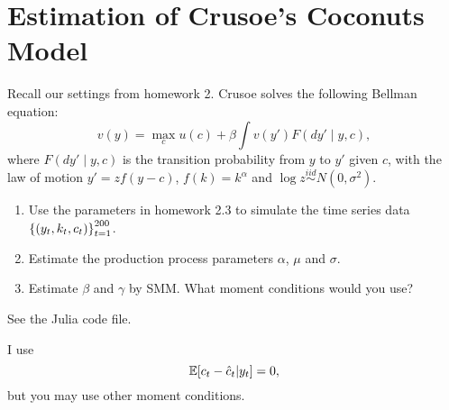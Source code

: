 \documentclass[12pt]{article}
\begin{document}
\section{Estimation of Crusoe's Coconuts Model}
Recall our settings from homework 2. Crusoe solves the following Bellman equation: 
\begin{equation*}
    v(y) = \max_{c} u(c) + \beta \int v(y') F(dy'\mid y, c),
\end{equation*}
where $F(dy'\mid y, c)$ is the transition probability from $y$ to $y'$ given $c$, 
with the law of motion $y' = zf(y - c)$, $f(k) = k^\alpha$ and $\log z\overset{iid}{\sim} N(0, \sigma^2)$.
\begin{enumerate}
    \item Use the parameters in homework 2.3 to simulate the time series data 
    $\left\{ {(y_t, k_t, c_t)} \right\}_{t=1}^{200}$. 
    \item Estimate the production process parameters $\alpha$, $\mu$ and $\sigma$.  
    \item Estimate $\beta$ and $\gamma$ by SMM. What 
    moment conditions would you use?
\end{enumerate}
\begin{sol}[1.1, 1.2]
    See the Julia code file.
\end{sol} 

\begin{sol}[1.3]
    I use 
    \begin{equation*}
        \Ex{c_t - \hat{c}_t|y_t} = 0,
    \end{equation*}
    but you may use other moment conditions.
\end{sol}
\end{document}

